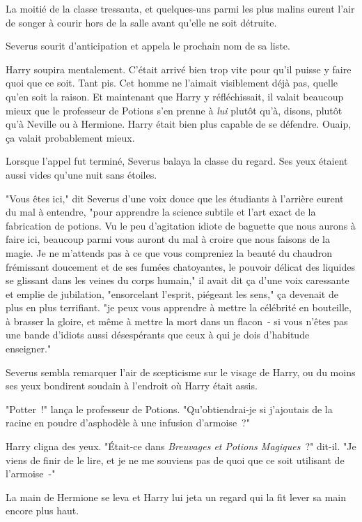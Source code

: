 La moitié de la classe tressauta, et quelques-uns parmi les plus malins eurent l'air de songer à courir hors de la salle avant qu'elle ne soit détruite.

Severus sourit d'anticipation et appela le prochain nom de sa liste.

Harry soupira mentalement. C'était arrivé bien trop vite pour qu'il puisse y faire quoi que ce soit. Tant pis. Cet homme ne l'aimait visiblement déjà pas, quelle qu'en soit la raison. Et maintenant que Harry y réfléchissait, il valait beaucoup mieux que le professeur de Potions s'en prenne à \emph{lui} plutôt qu'à, disons, plutôt qu'à Neville ou à Hermione. Harry était bien plus capable de se défendre. Ouaip, ça valait probablement mieux.

Lorsque l'appel fut terminé, Severus balaya la classe du regard. Ses yeux étaient aussi vides qu'une nuit sans étoiles.

"Vous êtes ici," dit Severus d'une voix douce que les étudiants à l'arrière eurent du mal à entendre, "pour apprendre la science subtile et l'art exact de la fabrication de potions. Vu le peu d'agitation idiote de baguette que nous aurons à faire ici, beaucoup parmi vous auront du mal à croire que nous faisons de la magie. Je ne m'attends pas à ce que vous compreniez la beauté du chaudron frémissant doucement et de ses fumées chatoyantes, le pouvoir délicat des liquides se glissant dans les veines du corps humain," il avait dit ça d'une voix caressante et emplie de jubilation, "ensorcelant l'esprit, piégeant les sens," ça devenait de plus en plus terrifiant. "je peux vous apprendre à mettre la célébrité en bouteille, à brasser la gloire, et même à mettre la mort dans un flacon~- si vous n'êtes pas une bande d'idiots aussi désespérants que ceux à qui je dois d'habitude enseigner."

Severus sembla remarquer l'air de scepticisme sur le visage de Harry, ou du moins ses yeux bondirent soudain à l'endroit où Harry était assis.

"Potter~!" lança le professeur de Potions. "Qu'obtiendrai-je si j'ajoutais de la racine en poudre d'asphodèle à une infusion d'armoise~?"

Harry cligna des yeux. "Était-ce dans \emph{Breuvages et Potions Magiques}~?" dit-il. "Je viens de finir de le lire, et je ne me souviens pas de quoi que ce soit utilisant de l'armoise~-"

La main de Hermione se leva et Harry lui jeta un regard qui la fit lever sa main encore plus haut.

